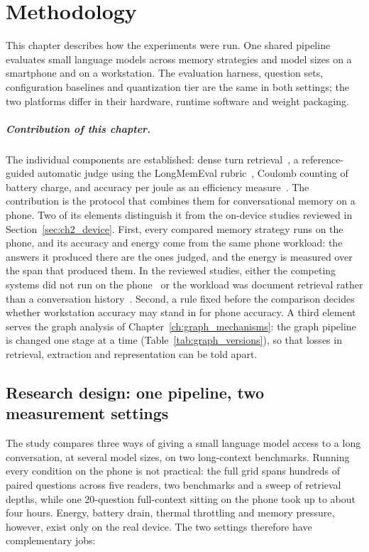 
\chapter{Methodology}
\label{ch:methodology}

This chapter describes how the experiments were run. One shared pipeline evaluates small language
models across memory strategies and model sizes on a smartphone and on a workstation. The evaluation
harness, question sets, configuration baselines and quantization tier are the same in both settings;
the two platforms differ in their hardware, runtime software and weight packaging.

\paragraph{Contribution of this chapter.} The individual components are established: dense turn
retrieval~\citep{dpr}, a reference-guided automatic judge using the LongMemEval
rubric~\citep{longmemeval}, Coulomb counting of battery charge, and accuracy per joule as an
efficiency measure~\citep{intelligence_per_watt}. The contribution is the protocol that combines
them for conversational memory on a phone. Two of its elements distinguish it from the on-device
studies reviewed in Section~\ref{sec:ch2_device}. First, every compared memory strategy runs on the
phone, and its accuracy and energy come from the same phone workload: the answers it produced there
are the ones judged, and the energy is measured over the span that produced them. In the reviewed
studies, either the competing systems did not run on the phone~\citep{smartrag} or the workload was
document retrieval rather than a conversation history~\citep{mobilerag_energy}. Second, a rule fixed
before the comparison decides whether workstation accuracy may stand in for phone accuracy. A third
element serves the graph analysis of Chapter~\ref{ch:graph_mechanisms}: the
graph pipeline is changed one stage at a time (Table~\ref{tab:graph_versions}), so that losses in
retrieval, extraction and representation can be told apart.

\section{Research design: one pipeline, two measurement settings}
\label{sec:design}

The study compares three ways of giving a small language model access to a long conversation, at
several model sizes, on two long-context benchmarks. Running every condition on the phone is not
practical: the full grid spans hundreds of paired questions across five readers, two benchmarks and
a sweep of retrieval depths, while one 20-question full-context sitting on the phone took up to about
four hours. Energy, battery drain, thermal throttling and memory pressure, however, exist only on the
real device. The two settings therefore have complementary jobs:

